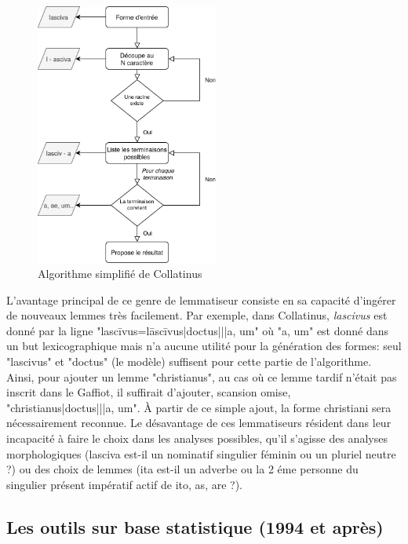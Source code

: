 \begin{figure}[h]
    \centering
    \includegraphics[width=6cm]{results/lemmatisation/outils/collatinus.png}
    \caption{Algorithme simplifié de Collatinus}
    \label{lemmatisation:outils:collatinusAlgorythme}
\end{figure}

L'avantage principal de ce genre de lemmatiseur consiste en sa capacité d'ingérer de nouveaux lemmes très facilement. Par exemple, dans Collatinus, \textit{lascivus} est donné par la ligne "lascīvus=lāscīvus|doctus|||a, um" où "a, um" est donné dans un but lexicographique mais n'a aucune utilité pour la génération des formes: seul "lascivus" et "doctus" (le modèle) suffisent pour cette partie de l'algorithme. Ainsi, pour ajouter un lemme "christianus", au cas où ce lemme tardif n'était pas inscrit dans le Gaffiot, il suffirait d'ajouter, scansion omise, "christianus|doctus|||a, um". À partir de ce simple ajout, la forme christiani sera nécessairement reconnue. Le désavantage de ces lemmatiseurs résident dans leur incapacité à faire le choix dans les analyses possibles, qu'il s'agisse des analyses morphologiques (lasciva est-il un nominatif singulier féminin ou un pluriel neutre ?) ou des choix de lemmes (ita est-il un adverbe ou la 2 éme personne du singulier présent impératif actif de ito, as, are ?).

\subsection{Les outils sur base statistique (1994 et après)}

